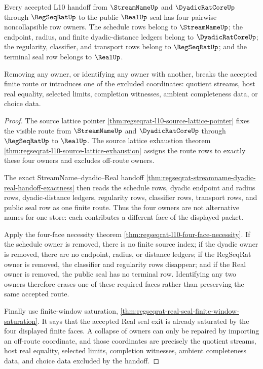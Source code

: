 \begin{theorem}
\label{thm:regseqrat-l10-row-owner-noncollapse}
Every accepted L10 handoff from $\StreamNameUp$ and $\DyadicRatCoreUp$ through
$\RegSeqRatUp$ to the public $\RealUp$ seal has four pairwise noncollapsible
row owners. The schedule rows belong to $\StreamNameUp$; the endpoint,
radius, and finite dyadic-distance ledgers belong to $\DyadicRatCoreUp$; the
regularity, classifier, and transport rows belong to $\RegSeqRatUp$; and the
terminal seal row belongs to $\RealUp$.

Removing any owner, or identifying any owner with another, breaks the accepted
finite route or introduces one of the excluded coordinates: quotient streams,
host real equality, selected limits, completion witnesses, ambient
completeness data, or choice data.
\end{theorem}
\begin{proof}
The source lattice pointer
\autoref{thm:regseqrat-l10-source-lattice-pointer} fixes the visible route
from $\StreamNameUp$ and $\DyadicRatCoreUp$ through $\RegSeqRatUp$ to
$\RealUp$. The source lattice exhaustion theorem
\autoref{thm:regseqrat-l10-source-lattice-exhaustion} assigns the route rows
to exactly these four owners and excludes off-route owners.

The exact StreamName--dyadic--Real handoff
\autoref{thm:regseqrat-streamname-dyadic-real-handoff-exactness} then reads
the schedule rows, dyadic endpoint and radius rows, dyadic-distance ledgers,
regularity rows, classifier rows, transport rows, and public seal row as one
finite route. Thus the four owners are not alternative names for one store:
each contributes a different face of the displayed packet.

Apply the four-face necessity theorem
\autoref{thm:regseqrat-l10-four-face-necessity}. If the schedule owner is
removed, there is no finite source index; if the dyadic owner is removed,
there are no endpoint, radius, or distance ledgers; if the RegSeqRat owner is
removed, the classifier and regularity rows disappear; and if the Real owner
is removed, the public seal has no terminal row. Identifying any two owners
therefore erases one of these required faces rather than preserving the same
accepted route.

Finally use finite-window saturation,
\autoref{thm:regseqrat-real-seal-finite-window-saturation}. It says that the
accepted Real seal exit is already saturated by the four displayed finite
faces. A collapse of owners can only be repaired by importing an off-route
coordinate, and those coordinates are precisely the quotient streams, host
real equality, selected limits, completion witnesses, ambient completeness
data, and choice data excluded by the handoff.
\end{proof}

